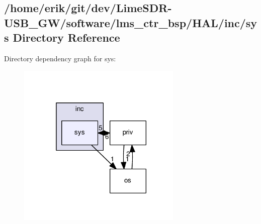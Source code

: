 \subsection{/home/erik/git/dev/\+Lime\+S\+D\+R-\/\+U\+S\+B\+\_\+\+G\+W/software/lms\+\_\+ctr\+\_\+bsp/\+H\+A\+L/inc/sys Directory Reference}
\label{dir_03a538e2140ea8651a407f7931b96a61}
Directory dependency graph for sys\+:
\nopagebreak
\begin{figure}[H]
\begin{center}
\leavevmode
\includegraphics[width=222pt]{dir_03a538e2140ea8651a407f7931b96a61_dep}
\end{center}
\end{figure}
